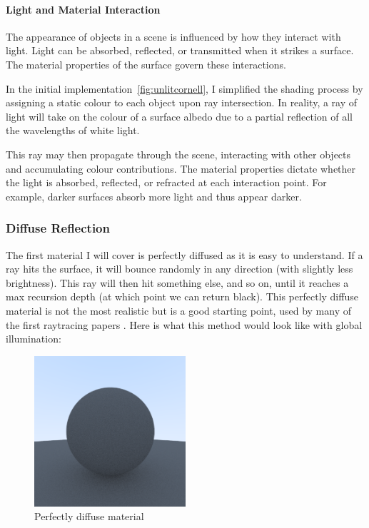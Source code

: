 \documentclass[12pt]{article}
\begin{document}
\paragraph{Light and Material Interaction}
The appearance of objects in a scene is influenced by how they interact with light. Light can be absorbed, reflected, or transmitted when it strikes a surface. The material properties of the surface govern these interactions.

In the initial implementation~\ref{fig:unlitcornell}, I simplified the shading process by assigning a static colour to each object upon ray intersection. In reality, a ray of light will take on the colour of a surface albedo due to a partial reflection of all the wavelengths of white light.

This ray may then propagate through the scene, interacting with other objects and accumulating colour contributions. The material properties dictate whether the light is absorbed, reflected, or refracted at each interaction point. For example, darker surfaces absorb more light and thus appear darker.

\subsubsection{Diffuse Reflection}
The first material I will cover is perfectly diffused as it is easy to understand. If a ray hits the surface, it will bounce randomly in any direction (with slightly less brightness). This ray will then hit something else, and so on, until it reaches a max recursion depth (at which point we can return black). This perfectly diffuse material is not the most realistic but is a good starting point, used by many of the first raytracing papers \cite{Whitted1980}. Here is what this method would look like with global illumination:

\begin{figure}[H]
    \centering
    \includegraphics[width=0.5\textwidth]{images/lambertian/uniform_diffuse.png}
    \caption{Perfectly diffuse material}
    \label{fig:perfdiffmat}
\end{figure}
\end{document}
